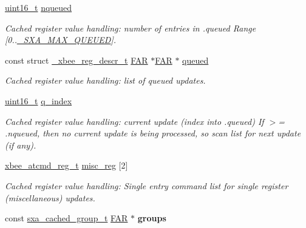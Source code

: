 \begin{DoxyCompactItemize}
\hyperlink{group__hal__dos_ga5a8b2dc9e45a9ee81a94ef304fb62505}{uint16\+\_\+t} \hyperlink{structsxa__node__t_a8de35431542d2c2508bb17ac8fa48a84}{nqueued}
\begin{DoxyCompactList}\small\item\em Cached register value handling\+: number of entries in .queued Range \mbox{[}0..\hyperlink{sxa_8h_a9e47d5fe0e89846d0bc2b3f1584382ae}{\+\_\+\+S\+X\+A\+\_\+\+M\+A\+X\+\_\+\+Q\+U\+E\+U\+ED}\mbox{]}. \end{DoxyCompactList}\item 
const struct \hyperlink{struct__xbee__reg__descr__t}{\+\_\+xbee\+\_\+reg\+\_\+descr\+\_\+t} \hyperlink{group__hal_gaef060b3456fdcc093a7210a762d5f2ed}{F\+AR} $\ast$\hyperlink{group__hal_gaef060b3456fdcc093a7210a762d5f2ed}{F\+AR} $\ast$ \hyperlink{structsxa__node__t_a17615250f94d830781403db708cd68d3}{queued}
\begin{DoxyCompactList}\small\item\em Cached register value handling\+: list of queued updates. \end{DoxyCompactList}\item 
\hyperlink{group__hal__dos_ga5a8b2dc9e45a9ee81a94ef304fb62505}{uint16\+\_\+t} \hyperlink{structsxa__node__t_a8aa02a31241baba968d2892c98971c65}{q\+\_\+index}
\begin{DoxyCompactList}\small\item\em Cached register value handling\+: current update (index into .queued) If $>$= .nqueued, then no current update is being processed, so scan list for next update (if any). \end{DoxyCompactList}\item 
\hyperlink{structxbee__atcmd__reg__t}{xbee\+\_\+atcmd\+\_\+reg\+\_\+t} \hyperlink{structsxa__node__t_ae825a2809f705ef65c961e8bfe3e98cc}{misc\+\_\+reg} \mbox{[}2\mbox{]}
\begin{DoxyCompactList}\small\item\em Cached register value handling\+: Single entry command list for single register (miscellaneous) updates. \end{DoxyCompactList}\item 
\mbox{\label{structsxa__node__t_a41aeca059e6fef32cb611359925a0c5c}} 
const \hyperlink{structsxa__cached__group__t}{sxa\+\_\+cached\+\_\+group\+\_\+t} \hyperlink{group__hal_gaef060b3456fdcc093a7210a762d5f2ed}{F\+AR} $\ast$ {\bfseries groups}
\item 
\mbox{\label{structsxa__node__t_ab2dff3a5f503f07dec32ae1e59c85898}} 

\end{DoxyCompactItemize}
